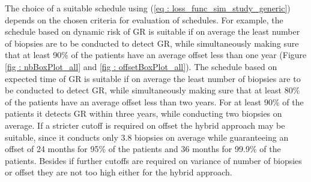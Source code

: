 The choice of a suitable schedule using (\ref{eq : loss_func_sim_study_generic}) depends on the chosen criteria for evaluation of schedules. For example, the schedule based on dynamic risk of GR is suitable if on average the least number of biopsies are to be conducted to detect GR, while simultaneously making sure that at least 90\% of the patients have an average offset less than one year (Figure \ref{fig : nbBoxPlot_all} and \ref{fig : offsetBoxPlot_all}). The schedule based on expected time of GR is suitable if on average the least number of biopsies are to be conducted to detect GR, while simultaneously making sure that at least 80\% of the patients have an average offset less than two years. For at least 90\% of the patients it detects GR within three years, while conducting two biopsies on average. If a stricter cutoff is required on offset the hybrid approach may be suitable, since it conducts only 3.8 biopsies on average while guaranteeing an offset of 24 months for 95\% of the patients and 36 months for 99.9\% of the patients. Besides if further cutoffs are required on variance of number of biopsies or offset they are not too high either for the hybrid approach.